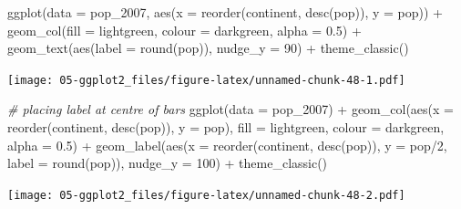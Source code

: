 \documentclass[
]{book}
\newenvironment{Shaded}{\begin{snugshade}}{\end{snugshade}}
\newcommand{\AttributeTok}[1]{\textcolor[rgb]{0.77,0.63,0.00}{#1}}
\newcommand{\CommentTok}[1]{\textcolor[rgb]{0.56,0.35,0.01}{\textit{#1}}}
\newcommand{\DecValTok}[1]{\textcolor[rgb]{0.00,0.00,0.81}{#1}}
\newcommand{\FloatTok}[1]{\textcolor[rgb]{0.00,0.00,0.81}{#1}}
\newcommand{\FunctionTok}[1]{\textcolor[rgb]{0.00,0.00,0.00}{#1}}
\newcommand{\NormalTok}[1]{#1}
\newcommand{\SpecialCharTok}[1]{\textcolor[rgb]{0.00,0.00,0.00}{#1}}
\newcommand{\StringTok}[1]{\textcolor[rgb]{0.31,0.60,0.02}{#1}}
\begin{document}
\begin{Shaded}
\begin{Highlighting}[]
\FunctionTok{ggplot}\NormalTok{(}\AttributeTok{data =}\NormalTok{ pop\_2007, }\FunctionTok{aes}\NormalTok{(}\AttributeTok{x =} \FunctionTok{reorder}\NormalTok{(continent, }\FunctionTok{desc}\NormalTok{(pop)), }\AttributeTok{y =}\NormalTok{ pop)) }\SpecialCharTok{+} 
   \FunctionTok{geom\_col}\NormalTok{(}\AttributeTok{fill =} \StringTok{\textquotesingle{}lightgreen\textquotesingle{}}\NormalTok{, }\AttributeTok{colour =} \StringTok{\textquotesingle{}darkgreen\textquotesingle{}}\NormalTok{, }\AttributeTok{alpha =} \FloatTok{0.5}\NormalTok{) }\SpecialCharTok{+}
   \FunctionTok{geom\_text}\NormalTok{(}\FunctionTok{aes}\NormalTok{(}\AttributeTok{label =} \FunctionTok{round}\NormalTok{(pop)), }\AttributeTok{nudge\_y =} \DecValTok{90}\NormalTok{) }\SpecialCharTok{+}
   \FunctionTok{theme\_classic}\NormalTok{()}
\end{Highlighting}
\end{Shaded}

\texttt{[image: 05-ggplot2\_files/figure-latex/unnamed-chunk-48-1.pdf]}

\begin{Shaded}
\begin{Highlighting}[]
\CommentTok{\# placing label at centre of bars}
\FunctionTok{ggplot}\NormalTok{(}\AttributeTok{data =}\NormalTok{ pop\_2007) }\SpecialCharTok{+} 
\FunctionTok{geom\_col}\NormalTok{(}\FunctionTok{aes}\NormalTok{(}\AttributeTok{x =} \FunctionTok{reorder}\NormalTok{(continent, }\FunctionTok{desc}\NormalTok{(pop)), }\AttributeTok{y =}\NormalTok{ pop), }
         \AttributeTok{fill =} \StringTok{\textquotesingle{}lightgreen\textquotesingle{}}\NormalTok{, }\AttributeTok{colour =} \StringTok{\textquotesingle{}darkgreen\textquotesingle{}}\NormalTok{, }\AttributeTok{alpha =} \FloatTok{0.5}\NormalTok{) }\SpecialCharTok{+}
   \FunctionTok{geom\_label}\NormalTok{(}\FunctionTok{aes}\NormalTok{(}\AttributeTok{x =} \FunctionTok{reorder}\NormalTok{(continent, }\FunctionTok{desc}\NormalTok{(pop)), }
                  \AttributeTok{y =}\NormalTok{ pop}\SpecialCharTok{/}\DecValTok{2}\NormalTok{, }\AttributeTok{label =} \FunctionTok{round}\NormalTok{(pop)), }\AttributeTok{nudge\_y =} \DecValTok{100}\NormalTok{) }\SpecialCharTok{+}
   \FunctionTok{theme\_classic}\NormalTok{()}
\end{Highlighting}
\end{Shaded}

\texttt{[image: 05-ggplot2\_files/figure-latex/unnamed-chunk-48-2.pdf]}
\end{document}
